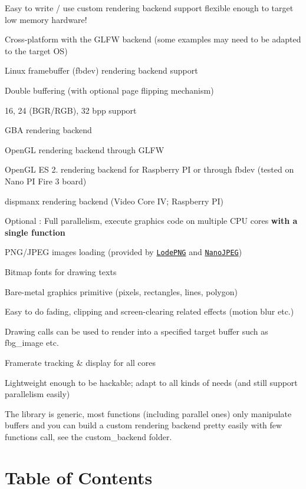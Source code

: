\begin{DoxyItemize}
\item Easy to write / use custom rendering backend support flexible enough to target low memory hardware!
\item Cross-\/platform with the G\+L\+FW backend (some examples may need to be adapted to the target OS)
\item Linux framebuffer (fbdev) rendering backend support
\begin{DoxyItemize}
\item Double buffering (with optional page flipping mechanism)
\item 16, 24 (B\+G\+R/\+R\+GB), 32 bpp support
\end{DoxyItemize}
\item G\+BA rendering backend
\item Open\+GL rendering backend through G\+L\+FW
\item Open\+GL ES 2. rendering backend for Raspberry PI or through fbdev (tested on Nano PI Fire 3 board)
\item dispmanx rendering backend (Video Core IV; Raspberry PI)
\item Optional \+: Full parallelism, execute graphics code on multiple C\+PU cores {\bfseries with a single function}
\item P\+N\+G/\+J\+P\+EG images loading (provided by \href{https://lodev.org/lodepng/}{\tt Lode\+P\+NG} and \href{http://keyj.emphy.de/nanojpeg/}{\tt Nano\+J\+P\+EG})
\item Bitmap fonts for drawing texts
\item Bare-\/metal graphics primitive (pixels, rectangles, lines, polygon)
\item Easy to do fading, clipping and screen-\/clearing related effects (motion blur etc.)
\item Drawing calls can be used to render into a specified target buffer such as fbg\+\_\+image etc.
\item Framerate tracking \& display for all cores
\item Lightweight enough to be hackable; adapt to all kinds of needs (and still support parallelism easily)
\end{DoxyItemize}

The library is generic, most functions (including parallel ones) only manipulate buffers and you can build a custom rendering backend pretty easily with few functions call, see the {\ttfamily custom\+\_\+backend} folder.

\section*{Table of Contents }


